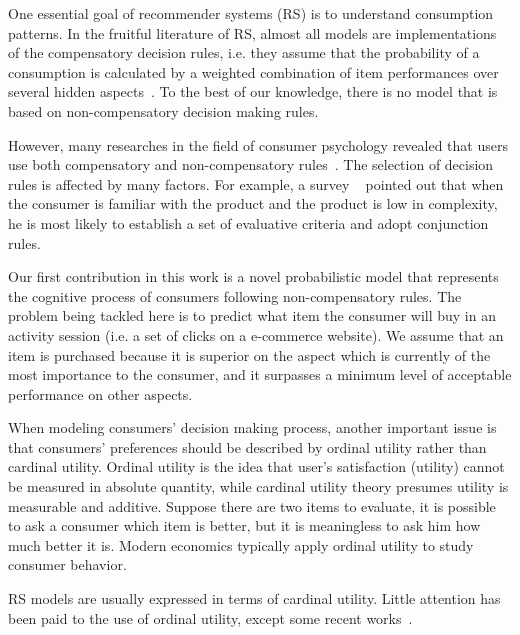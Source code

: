 \documentclass[sigconf]{acmart}
\begin{document}
One essential goal of recommender systems (RS) is to understand consumption patterns. In the fruitful literature of RS, almost all models are implementations of the compensatory decision rules, i.e. they assume that the probability of a consumption is calculated by a weighted combination of item performances over several hidden aspects~\cite{Hu2008Collaborative,Gopalan2015Scalable}.  To the best of our knowledge, there is no model that is based on non-compensatory decision making rules. 

However, many researches in the field of consumer psychology revealed that users use both compensatory and non-compensatory rules~\cite{Engel1986Consumer}. The selection of decision rules is affected by many factors.  For example,  a survey ~\cite{Park1976Effect} pointed out that when the consumer is familiar with the product and the product is low in  complexity, he is most likely to establish a set of evaluative criteria and adopt conjunction rules.    


Our first contribution in this work is a novel probabilistic model that represents the cognitive process of consumers following non-compensatory rules. The problem being tackled here is to predict what item the consumer will buy in an activity session (i.e. a set of clicks on a e-commerce website). We assume that an item is purchased because it is superior on the aspect which is currently of the most importance to the consumer, and it surpasses  a minimum level of acceptable performance on other aspects. 

When modeling consumers' decision making process, another important issue is that consumers' preferences should be described by ordinal utility rather than cardinal utility.  Ordinal utility is the idea that user's satisfaction (utility) cannot be measured in absolute quantity, while cardinal utility theory presumes utility is measurable and additive.  Suppose there are two items to evaluate, it is possible to ask a consumer which item is better, but it is meaningless to ask him how much better it is. Modern economics typically apply ordinal utility to study consumer behavior.


RS models are usually expressed in terms of cardinal utility. Little attention has been paid to the use of ordinal utility, except some recent works~\cite{Frolov2016Fifty}. 


\end{document}
